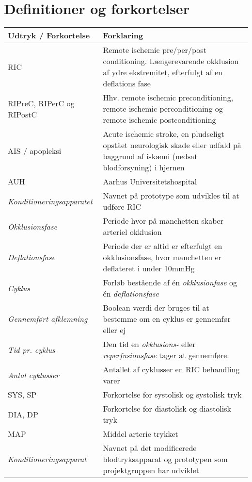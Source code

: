 \chapter*{Definitioner og forkortelser}
	\begin{longtable}{ |p{} |p{}| } 
		\hline
		\textbf{Udtryk / Forkortelse} &  \textbf{Forklaring} \\
		\hline
		RIC & Remote ischemic pre/per/post conditioning. Længerevarende okklusion af ydre ekstremitet, efterfulgt af en deflations fase\\
		\hline
		RIPreC, RIPerC og RIPostC & Hhv. remote ischemic preconditioning, remote ischemic perconditioning og remote ischemic postconditioning\\
		\hline
		AIS / apopleksi & Acute ischemic stroke, en pludseligt opstået neurologisk skade eller udfald på baggrund af iskæmi (nedsat blodforsyning) i hjernen \\
		\hline
		AUH & Aarhus Universitetshospital \\
		\hline
		\textit{Konditioneringsapparatet} & Navnet på prototype som udvikles til at udføre RIC \\
		\hline
		\textit{Okklusionsfase} & Periode hvor på manchetten skaber arteriel okklusion \\
		\hline
		\textit{Deflationsfase} & Periode der er altid er efterfulgt en okklusionsfase, hvor manchetten er deflateret i under 10mmHg\\
		\hline
		\textit{Cyklus} & Forløb bestående af én \textit{okklusionfase} og én \textit{deflationsfase} \\
		\hline
		\textit{Gennemført afklemning} & Boolean værdi der bruges til at bestemme om en cyklus er gennemfør eller ej \\
		\hline
		\textit{Tid pr. cyklus} & Den tid en \textit{okklusions-} eller \textit{reperfusionsfase} tager at gennemføre. \\
		\hline
		\textit{Antal cyklusser} & Antallet af cyklusser en RIC behandling varer \\
		\hline
		SYS, SP & Forkortelse for systolisk og systolisk tryk \\
		\hline
		DIA, DP & Forkortelse for diastolisk og diastolisk tryk \\
		\hline
		MAP & Middel arterie trykket \\
		\hline
		\textit{Konditioneringsapparat} & Navnet på det modificerede blodtryksapparat og prototypen som projektgruppen har udviklet \\

\end{longtable}
